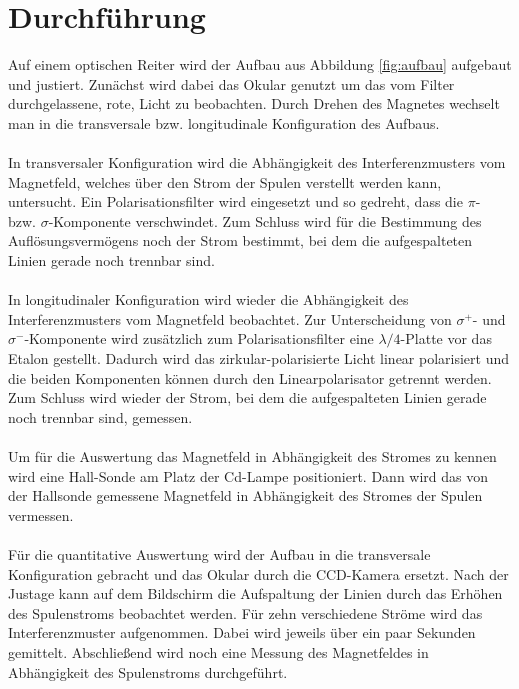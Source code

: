 \section{Durchführung}
Auf einem optischen Reiter wird der Aufbau aus Abbildung \ref{fig:aufbau} aufgebaut und justiert. Zunächst wird dabei das Okular genutzt um das vom Filter durchgelassene, rote, Licht zu beobachten. Durch Drehen des Magnetes wechselt man in die transversale bzw. longitudinale Konfiguration des Aufbaus. \\ \\
In transversaler Konfiguration wird die Abhängigkeit des Interferenzmusters vom Magnetfeld, welches über den Strom der Spulen verstellt werden kann, untersucht. Ein Polarisationsfilter wird eingesetzt und so gedreht, dass die $\pi$- bzw. $\sigma$-Komponente verschwindet. Zum Schluss wird für die Bestimmung des Auflösungsvermögens noch der Strom bestimmt, bei dem die aufgespalteten Linien gerade noch trennbar sind.\\ \\
In longitudinaler Konfiguration wird wieder die Abhängigkeit des Interferenzmusters vom Magnetfeld beobachtet. Zur Unterscheidung von $\sigma^+$- und $\sigma^-$-Komponente wird zusätzlich zum Polarisationsfilter eine $\lambda/4$-Platte vor das Etalon gestellt. Dadurch wird das zirkular-polarisierte Licht linear polarisiert und die beiden Komponenten können durch den Linearpolarisator getrennt werden. Zum Schluss wird wieder der Strom, bei dem die aufgespalteten Linien gerade noch trennbar sind, gemessen. \\ \\
Um für die Auswertung das Magnetfeld in Abhängigkeit des Stromes zu kennen wird eine Hall-Sonde am Platz der Cd-Lampe positioniert. Dann wird das von der Hallsonde gemessene Magnetfeld in Abhängigkeit des Stromes der Spulen vermessen.\\ \\
Für die quantitative Auswertung wird der Aufbau in die transversale Konfiguration gebracht und das Okular durch die CCD-Kamera ersetzt. Nach der Justage kann auf dem Bildschirm die Aufspaltung der Linien durch das Erhöhen des Spulenstroms beobachtet werden. Für zehn verschiedene Ströme wird das Interferenzmuster aufgenommen. Dabei wird jeweils über ein paar Sekunden gemittelt. Abschließend wird noch eine Messung des Magnetfeldes in Abhängigkeit des Spulenstroms durchgeführt. 


